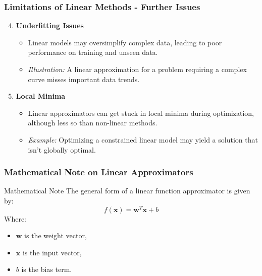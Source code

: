 \documentclass[aspectratio=169]{beamer}
\begin{document}
\begin{frame}[fragile]
    \frametitle{Limitations of Linear Methods - Further Issues}
    \begin{enumerate}
        \setcounter{enumi}{3} %
        \item \textbf{Underfitting Issues}
            \begin{itemize}
                \item Linear models may oversimplify complex data, leading to poor performance on training and unseen data.
                \item \textit{Illustration:} A linear approximation for a problem requiring a complex curve misses important data trends.
            \end{itemize}
        
        \item \textbf{Local Minima}
            \begin{itemize}
                \item Linear approximators can get stuck in local minima during optimization, although less so than non-linear methods.
                \item \textit{Example:} Optimizing a constrained linear model may yield a solution that isn’t globally optimal.
            \end{itemize}
    \end{enumerate}
\end{frame}

\begin{frame}[fragile]
    \frametitle{Mathematical Note on Linear Approximators}
    \begin{block}{Mathematical Note}
        The general form of a linear function approximator is given by:
        \begin{equation}
            f(\mathbf{x}) = \mathbf{w}^T \mathbf{x} + b
        \end{equation}
        Where:
        \begin{itemize}
            \item \( \mathbf{w} \) is the weight vector,
            \item \( \mathbf{x} \) is the input vector,
            \item \( b \) is the bias term.
        \end{itemize}
    \end{block}
\end{frame}
\end{document}
